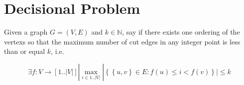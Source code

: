 \section{Decisional Problem}
Given a graph $G = (V, E)$ and $k \in \mathds{N}$, say if there exists
one ordering of the vertexs
so that the maximum number of cut edges 
in any integer point is less than or equal $k$, i.e.

\[
\exists f : V \rightarrow [1..|V| ]  |
\max_{i \in 1..|V|}
  |
  \left \{
    \left \{
      u, v
    \right \} 
    \in E : f (u) \leq i < f (v)
  \right \}
  | \leq k
\]
